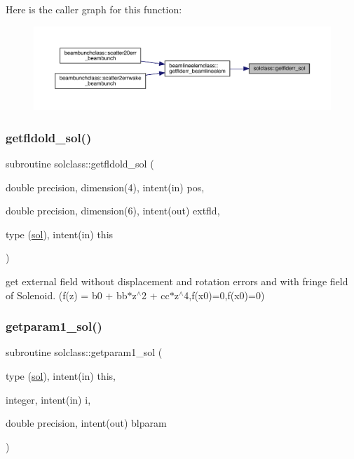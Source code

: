 Here is the caller graph for this function\+:\nopagebreak
\begin{figure}[H]
\begin{center}
\leavevmode
\includegraphics[width=350pt]{namespacesolclass_a571ab7b6c8ce4dd9e7eaa2489b874682_icgraph}
\end{center}
\end{figure}
\mbox{\label{namespacesolclass_a592dd58600b2d6df21aab781e8faebac}} 
\subsubsection{\texorpdfstring{getfldold\_sol()}{getfldold\_sol()}}
{\footnotesize\ttfamily subroutine solclass\+::getfldold\+\_\+sol (\begin{DoxyParamCaption}\item[{double precision, dimension(4), intent(in)}]{pos,  }\item[{double precision, dimension(6), intent(out)}]{extfld,  }\item[{type (\mbox{\hyperlink{namespacesolclass_structsolclass_1_1sol}{sol}}), intent(in)}]{this }\end{DoxyParamCaption})}



get external field without displacement and rotation errors and with fringe field of Solenoid. (f(z) = b0 + bb$\ast$z$^\wedge$2 + cc$\ast$z$^\wedge$4,f(x0)=0,f\textquotesingle{}(x0)=0) 

\mbox{\label{namespacesolclass_a68e03415e9802b36da3ec9bae72f41b7}} 
\subsubsection{\texorpdfstring{getparam1\_sol()}{getparam1\_sol()}}
{\footnotesize\ttfamily subroutine solclass\+::getparam1\+\_\+sol (\begin{DoxyParamCaption}\item[{type (\mbox{\hyperlink{namespacesolclass_structsolclass_1_1sol}{sol}}), intent(in)}]{this,  }\item[{integer, intent(in)}]{i,  }\item[{double precision, intent(out)}]{blparam }\end{DoxyParamCaption})}

